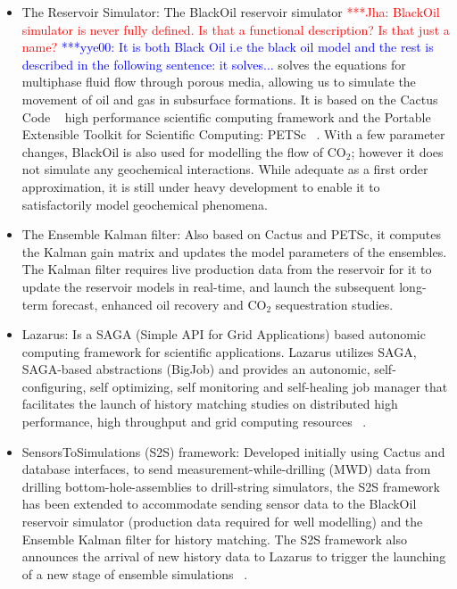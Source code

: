 \documentclass[10pt,conference,final]{IEEEtran}
\newcommand{\jhanote}[1]{ {\textcolor{red} { ***Jha: #1 }}}
\newcommand{\yyenote}[1]{ {\textcolor{blue} { ***yye00: #1 }}}
\newcommand{\jhanote}[1]{}
\newcommand{\yyenote}[1]{}
\begin{document}
\begin{itemize}
\item The Reservoir Simulator: The BlackOil reservoir simulator \jhanote{BlackOil simulator is never fully defined. Is that a functional description? Is that just a name?} \yyenote{It is both Black Oil i.e the black oil model and the rest is described in the following sentence: it solves...} solves the equations for multiphase fluid flow through porous media, allowing us to simulate the movement of oil and gas in subsurface formations. It is based on the Cactus Code ~\cite{cactus_web} high performance scientific computing framework and the Portable Extensible Toolkit for Scientific Computing: PETSc ~\cite{PETSc}. With a few parameter changes, BlackOil is also used for modelling the flow of CO$_2$; however it does not simulate any geochemical interactions. While adequate as a first order approximation, it is still under heavy development to enable it to satisfactorily model geochemical phenomena.

\item The Ensemble Kalman filter: Also based on Cactus and PETSc, it computes the Kalman 
gain matrix and updates the model parameters of the ensembles. The Kalman filter requires 
live production data from the reservoir for it to update the reservoir models in 
real-time, and launch the subsequent long-term forecast, enhanced oil recovery and CO$_2$ 
sequestration studies.

\item Lazarus: Is a SAGA (Simple API for Grid Applications) based autonomic computing 
framework for scientific applications. Lazarus utilizes SAGA, SAGA-based 
abstractions (BigJob) and provides an autonomic, self-configuring, self optimizing, self 
monitoring and self-healing job manager that facilitates the launch of history matching 
studies on distributed high performance, high throughput and grid computing resources 
~\cite{gmac}.

\item SensorsToSimulations (S2S) framework: Developed initially using Cactus and database interfaces, to send measurement-while-drilling (MWD) data from drilling bottom-hole-assemblies to drill-string simulators, the S2S framework has been extended to accommodate sending sensor data to the BlackOil reservoir simulator (production data required for well modelling) and the Ensemble Kalman filter for history matching. The S2S framework also announces the arrival of new history data to Lazarus to trigger the launching of a new stage of ensemble simulations ~\cite{Duff2,Duff1}.

\end{itemize}
\end{document}
